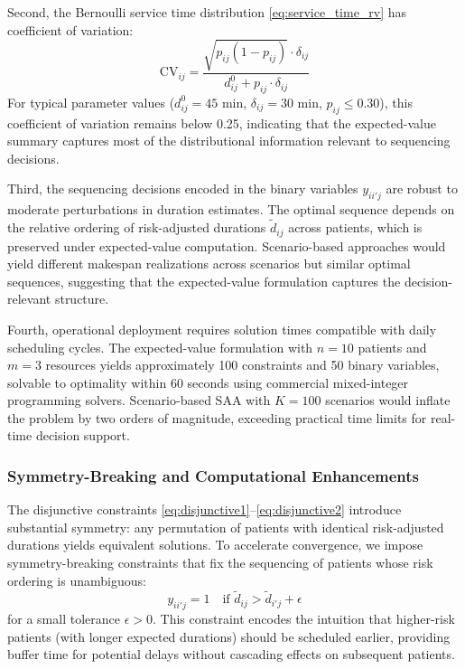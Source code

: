 \documentclass[msom,blindrev]{informs3}
\begin{document}
Second, the Bernoulli service time distribution \eqref{eq:service_time_rv} has coefficient of variation:
\begin{equation}
\text{CV}_{ij} = \frac{\sqrt{p_{ij}(1-p_{ij})} \cdot \delta_{ij}}{d_{ij}^0 + p_{ij} \cdot \delta_{ij}}
\end{equation}
For typical parameter values ($d_{ij}^0 = 45$ min, $\delta_{ij} = 30$ min, $p_{ij} \leq 0.30$), this coefficient of variation remains below 0.25, indicating that the expected-value summary captures most of the distributional information relevant to sequencing decisions.

Third, the sequencing decisions encoded in the binary variables $y_{ii'j}$ are robust to moderate perturbations in duration estimates. The optimal sequence depends on the relative ordering of risk-adjusted durations $\tilde{d}_{ij}$ across patients, which is preserved under expected-value computation. Scenario-based approaches would yield different makespan realizations across scenarios but similar optimal sequences, suggesting that the expected-value formulation captures the decision-relevant structure.

Fourth, operational deployment requires solution times compatible with daily scheduling cycles. The expected-value formulation with $n = 10$ patients and $m = 3$ resources yields approximately 100 constraints and 50 binary variables, solvable to optimality within 60 seconds using commercial mixed-integer programming solvers. Scenario-based SAA with $K = 100$ scenarios would inflate the problem by two orders of magnitude, exceeding practical time limits for real-time decision support.

\subsubsection{Symmetry-Breaking and Computational Enhancements}

The disjunctive constraints \eqref{eq:disjunctive1}--\eqref{eq:disjunctive2} introduce substantial symmetry: any permutation of patients with identical risk-adjusted durations yields equivalent solutions. To accelerate convergence, we impose symmetry-breaking constraints that fix the sequencing of patients whose risk ordering is unambiguous:
\begin{equation}
y_{ii'j} = 1 \quad \text{if } \tilde{d}_{ij} > \tilde{d}_{i'j} + \epsilon
\label{eq:symmetry_breaking}
\end{equation}
for a small tolerance $\epsilon > 0$. This constraint encodes the intuition that higher-risk patients (with longer expected durations) should be scheduled earlier, providing buffer time for potential delays without cascading effects on subsequent patients.
\end{document}
